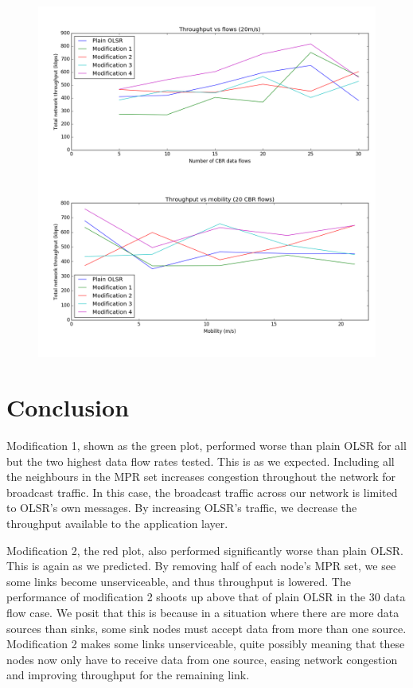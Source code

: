 \documentclass[12pt,a4paper]{article}
\begin{document}
\begin{figure}[ht]
\centering
\includegraphics[width=\textwidth]{figure_1}
\end{figure}

\section{Conclusion}
Modification 1, shown as the green plot, performed worse than plain OLSR for all but the two highest data flow rates tested. This is as we expected. Including all the neighbours in the MPR set increases congestion throughout the network for broadcast traffic. In this case, the broadcast traffic across our network is limited to OLSR's own messages. By increasing OLSR's traffic, we decrease the throughput available to the application layer.

Modification 2, the red plot, also performed significantly worse than plain OLSR. This is again as we predicted. By removing half of each node's MPR set, we see some links become unserviceable, and thus throughput is lowered. The performance of modification 2 shoots up above that of plain OLSR in the 30 data flow case. We posit that this is because in a situation where there are more data sources than sinks, some sink nodes must accept data from more than one source. Modification 2 makes some links unserviceable, quite possibly meaning that these nodes now only have to receive data from one source, easing network congestion and improving throughput for the remaining link.



\end{document}
